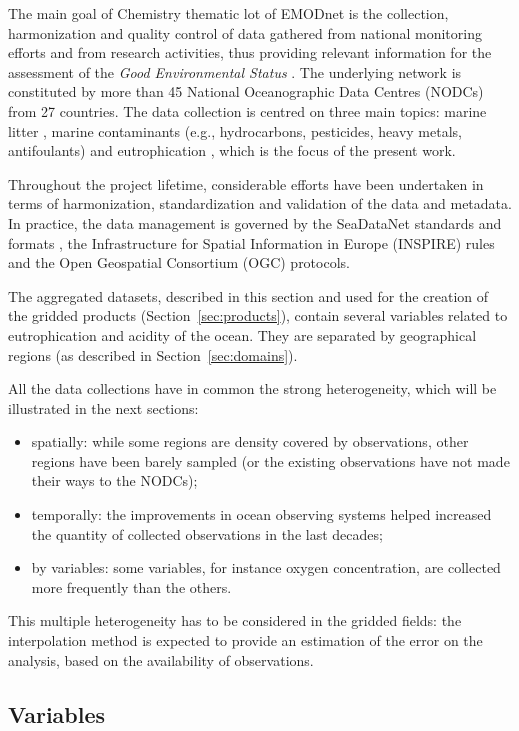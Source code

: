 \documentclass[essd,manuscript]{copernicus}
\begin{document}
The main goal of Chemistry thematic lot of EMODnet is the collection, harmonization and quality control of data gathered from national monitoring efforts and from research activities, thus providing relevant information for the assessment of the \textit{Good Environmental Status} \citep[GES,][]{Vinci2017}. The underlying network is constituted by more than 45 National Oceanographic Data Centres (NODCs) from 27 countries. The data collection is centred on three main topics: marine litter \citep{Vinci2018}, marine contaminants (e.g., hydrocarbons, pesticides, heavy metals, antifoulants) and eutrophication \citep{Giorgetti2020}, which is the focus of the present work. 

Throughout the project lifetime, considerable efforts have been undertaken in terms of harmonization, standardization and validation of the data and metadata. In practice, the data management is governed by the SeaDataNet standards and formats \citep{Schaap2010}, the Infrastructure for Spatial Information in Europe (INSPIRE) rules and the Open Geospatial Consortium (OGC) protocols. 

The aggregated datasets, described in this section and used for the creation of the gridded products (Section~\ref{sec:products}), contain several variables related to eutrophication and acidity of the ocean. They are separated by geographical regions (as described in Section~\ref{sec:domains}).

All the data collections have in common the strong heterogeneity, which will be illustrated in the next sections: 
\begin{itemize}
\item spatially: while some regions are density covered by observations, other regions have been barely sampled (or the existing observations have not made their ways to the NODCs);
\item temporally: the improvements in ocean observing systems helped increased the quantity of collected observations in the last decades;
\item by variables: some variables, for instance oxygen concentration, are collected more frequently than the others.
\end{itemize}
This multiple heterogeneity has to be considered in the gridded fields: the interpolation method is expected to provide an estimation of the error on the analysis, based on the availability of observations. 


\subsection{Variables\label{sec:variables}}
\end{document}
